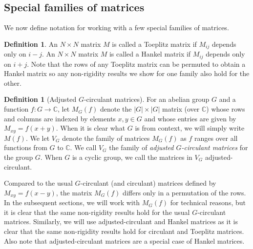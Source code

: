 \documentclass[11pt]{article}
\numberwithin{equation}{section}
\theoremstyle{definition}
\theoremstyle{plain}
\newcommand{\C}{\mathbb C}
\theoremstyle{definition}
\newtheorem{define}[theorem]{Definition}
\renewcommand\C{{\mathbb{C}}}
\begin{document}
%
\subsection{Special families of matrices} \label{sec:specialmatrices}   %
We now define notation for working with a few special families of matrices.
\begin{define}
An $N \times N$ matrix $M$ is called a Toeplitz matrix if $M_{ij}$ depends only on $i-j$.  An $N \times N$ matrix $M$ is called a Hankel matrix if $M_{ij}$ depends only on $i + j$.  Note that the rows of any Toeplitz matrix can be permuted to obtain a Hankel matrix so any non-rigidity results we show for one family also hold for the other.
\end{define}


\begin{define}[Adjusted $G$-circulant matrices] %
For an abelian group $G$ and a function $f: G \rightarrow \C$, let $M_G(f)$ denote the $|G| \times |G|$ matrix (over $\C$) whose rows and columns are indexed by elements $x,y \in G$ and whose entries are given by $M_{xy} = f(x + y)$.  When it is clear what $G$ is from context, we will simply write $M(f)$.  We let $V_G$ denote the family of matrices $M_G(f)$ as $f$ ranges over all functions from $G$ to $\C$.  We call $V_G$ the family of 
\emph{adjusted   %
%
$G$-circulant    %
matrices} for the group $G$.  When $G$ is a cyclic group, we call the matrices in $V_G$ adjusted-circulant. 
\end{define}
Compared to the usual 
%
$G$-circulant    %
(and circulant) matrices defined by $M_{xy} =  f(x-y)$, the matrix $M_G(f)$ differs only in a permutation of the rows.  In the
%
%
subsequent  %
sections, we will work with $M_G(f)$ for technical reasons, but it is clear that the same non-rigidity results hold for the usual 
%
$G$-circulant    %
matrices.  Similarly, we will use adjusted-circulant and Hankel matrices as it is clear that the same non-rigidity results hold for circulant and Toeplitz matrices.  Also note that adjusted-circulant matrices are a special case of Hankel matrices.

%
%
%
%
%
%
%
%
%
%
%

%
\end{document}
